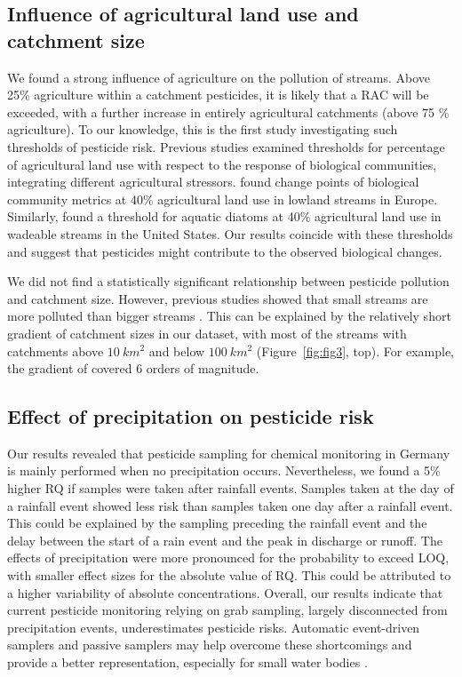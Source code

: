 \documentclass[journal=esthag,manuscript=article]{achemso}
\begin{document}
\subsection{Influence of agricultural land use and catchment size}
We found a strong influence of agriculture on the pollution of streams.
Above 25\% agriculture within a catchment pesticides, it is likely that a RAC will be exceeded, with a further increase in entirely agricultural catchments (above 75 \% agriculture).
To our knowledge, this is the first study investigating such thresholds of pesticide risk.
Previous studies examined thresholds for percentage of agricultural land use with respect to the response of biological communities, integrating different agricultural stressors.
\citet{feld_response_2013} found change points of biological community metrics at 40\% agricultural land use in lowland streams in Europe.
Similarly, \citet{waite_agricultural_2014} found a threshold for aquatic diatoms at 40\% agricultural land use in wadeable streams in the United States.
Our results coincide with these thresholds and suggest that pesticides might contribute to the observed biological changes. 

We did not find a statistically significant relationship between pesticide pollution and catchment size.
However, previous studies showed that small streams are more polluted than bigger streams \citep{schulz_field_2004,stehle_pesticide_2015,knauer_pesticides_2016}.
This can be explained by the relatively short gradient of catchment sizes in our dataset, with most of the streams with catchments above $10~km^2$ and below $100~km^2$ (Figure~\ref{fig:fig3}, top).
For example, the gradient of \citet{schulz_field_2004} covered 6 orders of magnitude.


\subsection{Effect of precipitation on pesticide risk}
Our results revealed that pesticide sampling for chemical monitoring in Germany is mainly performed when no precipitation occurs. 
Nevertheless, we found a 5\% higher RQ if samples were taken after rainfall events. 
Samples taken at the day of a rainfall event showed less risk than samples taken one day after a rainfall event.
This could be explained by the sampling preceding the rainfall event and the delay between the start of a rain event and the peak in discharge or runoff. 
The effects of precipitation were more pronounced for the probability to exceed LOQ, with smaller effect sizes for the absolute value of RQ. 
This could be attributed to a higher variability of absolute concentrations.
Overall, our results indicate that current pesticide monitoring relying on grab sampling, largely disconnected from precipitation events, underestimates pesticide risks.
Automatic event-driven samplers \citep{stehle_probabilistic_2013} and passive samplers \citep{fernandez_calibration_2014,moschet_evaluation_2015} may help overcome these shortcomings and provide a better representation, especially for small water bodies \citep{lorenz_specifics_2016}. 
\end{document}
